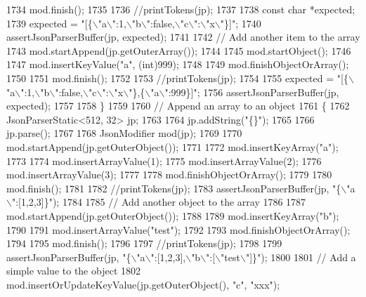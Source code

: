 \begin{DoxyCode}
{{{{{{{{{{{{{{{{{{{{{1734         mod.finish();
1735 
1736         \textcolor{comment}{//printTokens(jp);}
1737 
1738         \textcolor{keyword}{const} \textcolor{keywordtype}{char} *expected;
1739         expected = \textcolor{stringliteral}{"[\{\(\backslash\)"a\(\backslash\)":1,\(\backslash\)"b\(\backslash\)":false,\(\backslash\)"c\(\backslash\)":\(\backslash\)"x\(\backslash\)"\}]"};
1740         assertJsonParserBuffer(jp, expected);
1741 
1742         \textcolor{comment}{// Add another item to the array}
1743         mod.startAppend(jp.getOuterArray());
1744 
1745         mod.startObject();
1746 
1747         mod.insertKeyValue(\textcolor{stringliteral}{"a"}, (\textcolor{keywordtype}{int})999);
1748 
1749         mod.finishObjectOrArray();
1750 
1751         mod.finish();
1752 
1753         \textcolor{comment}{//printTokens(jp);}
1754 
1755         expected = \textcolor{stringliteral}{"[\{\(\backslash\)"a\(\backslash\)":1,\(\backslash\)"b\(\backslash\)":false,\(\backslash\)"c\(\backslash\)":\(\backslash\)"x\(\backslash\)"\},\{\(\backslash\)"a\(\backslash\)":999\}]"};
1756         assertJsonParserBuffer(jp, expected);
1757 
1758     \}
1759 
1760     \textcolor{comment}{// Append an array to an object}
1761     \{
1762         JsonParserStatic<512, 32> jp;
1763 
1764         jp.addString(\textcolor{stringliteral}{"\{\}"});
1765 
1766         jp.parse();
1767 
1768         JsonModifier mod(jp);
1769 
1770         mod.startAppend(jp.getOuterObject());
1771 
1772         mod.insertKeyArray(\textcolor{stringliteral}{"a"});
1773 
1774         mod.insertArrayValue(1);
1775         mod.insertArrayValue(2);
1776         mod.insertArrayValue(3);
1777 
1778         mod.finishObjectOrArray();
1779 
1780         mod.finish();
1781 
1782         \textcolor{comment}{//printTokens(jp);}
1783         assertJsonParserBuffer(jp, \textcolor{stringliteral}{"\{\(\backslash\)"a\(\backslash\)":[1,2,3]\}"});
1784 
1785         \textcolor{comment}{// Add another object to the array}
1786 
1787         mod.startAppend(jp.getOuterObject());
1788 
1789         mod.insertKeyArray(\textcolor{stringliteral}{"b"});
1790 
1791         mod.insertArrayValue(\textcolor{stringliteral}{"test"});
1792 
1793         mod.finishObjectOrArray();
1794 
1795         mod.finish();
1796 
1797         \textcolor{comment}{//printTokens(jp);}
1798 
1799         assertJsonParserBuffer(jp, \textcolor{stringliteral}{"\{\(\backslash\)"a\(\backslash\)":[1,2,3],\(\backslash\)"b\(\backslash\)":[\(\backslash\)"test\(\backslash\)"]\}"});
1800 
1801         \textcolor{comment}{// Add a simple value to the object}
1802         mod.insertOrUpdateKeyValue(jp.getOuterObject(), \textcolor{stringliteral}{"c"}, \textcolor{stringliteral}{"xxx"});
}}}}}}}}}}}}}}}}}}}}}
\end{DoxyCode}
